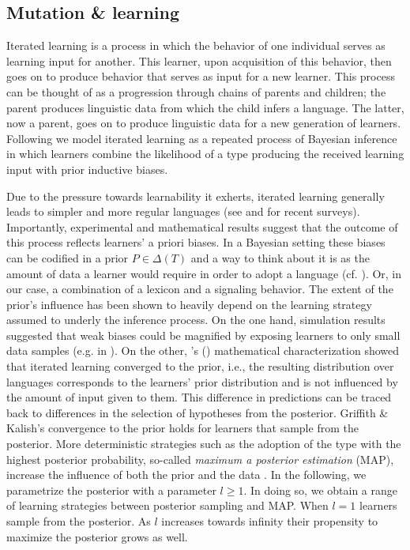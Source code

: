 \documentclass[a4paper]{article}
\newcommand{\citeposs}[2][]{\citeauthor{#2}'s (\citeyear[#1]{#2})}
\begin{document}

\subsection{Mutation \& learning}\label{sec:learnability}
Iterated learning is a process in which the behavior of one individual serves as learning input for another. This learner, upon acquisition of this behavior, then goes on to produce behavior that serves as input for a new learner. This process can be thought of as a progression through chains of parents and children; the parent produces linguistic data from which the child infers a language. The latter, now a parent, goes on to produce linguistic data for a new generation of learners. Following \citet{griffiths+kalish:2007} we model iterated learning as a repeated process of Bayesian inference in which learners combine the likelihood of a type producing the received learning input with prior inductive biases. 

Due to the pressure towards learnability it exherts, iterated learning generally leads to simpler and more regular languages (see \citealt{kirby+etal:2014} and \citealt{tamariz+kirby:2016} for recent surveys). Importantly, experimental and mathematical results suggest that the outcome of this process reflects learners' a priori biases. In a Bayesian setting these biases can be codified in a prior $P \in \Delta(T)$ and a way to think about it is as the amount of data a learner would require in order to adopt a language (cf. \citealt[450]{griffiths+kalish:2007}). Or, in our case, a combination of a lexicon and a signaling behavior. The extent of the prior's influence has been shown to heavily depend on the learning strategy assumed to underly the inference process. On the one hand, simulation results suggested that weak biases could be magnified by exposing learners to only small data samples (e.g. in \citealt{brighton:2002}). On the other, \citeposs{griffiths+kalish:2007} mathematical characterization showed that iterated learning converged to the prior, i.e., the resulting distribution over languages corresponds to the learners' prior distribution and is not influenced by the amount of input given to them. This difference in predictions can be traced back to differences in the selection of hypotheses from the posterior. Griffith \& Kalish's convergence to the prior holds for learners that sample from the posterior. More deterministic strategies such as the adoption of the type with the highest posterior probability, so-called {\it maximum a posterior estimation} (MAP), increase the influence of both the prior and the data \citep{griffiths+kalish:2007,kirby+etal:2007}. In the following, we parametrize the posterior with a parameter $l \geq 1$. In doing so, we obtain a range of learning strategies between posterior sampling and MAP. When $l = 1$ learners sample from the posterior. As $l$ increases towards infinity their propensity to maximize the posterior grows as well. 
\end{document}

